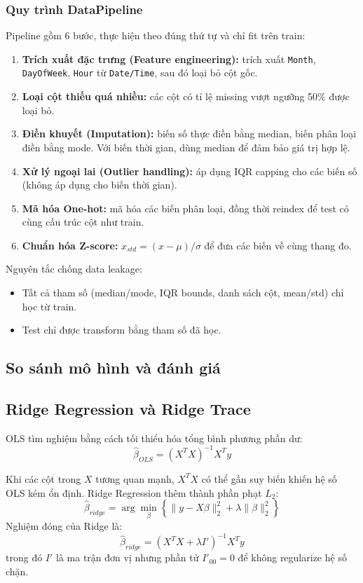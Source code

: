\documentclass[a4paper]{article}
\begin{document}
\subsubsection{Quy trình DataPipeline}
Pipeline gồm 6 bước, thực hiện theo đúng thứ tự và chỉ fit trên train:
\begin{enumerate}
    \item \textbf{Trích xuất đặc trưng (Feature engineering):} trích xuất \texttt{Month}, \texttt{DayOfWeek}, \texttt{Hour} từ \texttt{Date/Time}, sau đó loại bỏ cột gốc.
    \item \textbf{Loại cột thiếu quá nhiều:} các cột có tỉ lệ missing vượt ngưỡng 50\% được loại bỏ.
    \item \textbf{Điền khuyết (Imputation):} biến số thực điền bằng median, biến phân loại điền bằng mode. Với biến thời gian, dùng median để đảm bảo giá trị hợp lệ.
    \item \textbf{Xử lý ngoại lai (Outlier handling):} áp dụng IQR capping cho các biến số (không áp dụng cho biến thời gian).
    \item \textbf{Mã hóa One-hot:} mã hóa các biến phân loại, đồng thời reindex để test có cùng cấu trúc cột như train.
    \item \textbf{Chuẩn hóa Z-score:} $x_{std} = (x-\mu)/\sigma$ để đưa các biến về cùng thang đo.
\end{enumerate}

Nguyên tắc chống data leakage:
\begin{itemize}
    \item Tất cả tham số (median/mode, IQR bounds, danh sách cột, mean/std) chỉ học từ train.
    \item Test chỉ được transform bằng tham số đã học.
\end{itemize}

\subsection{So sánh mô hình và đánh giá}

\subsection{Ridge Regression và Ridge Trace}
OLS tìm nghiệm bằng cách tối thiểu hóa tổng bình phương phần dư:
\begin{equation}
\hat{\beta}_{OLS} = (X^T X)^{-1}X^T y
\end{equation}

Khi các cột trong $X$ tương quan mạnh, $X^T X$ có thể gần suy biến khiến hệ số OLS kém ổn định. Ridge Regression thêm thành phần phạt $L_2$:
\begin{equation}
\hat{\beta}_{ridge} = \arg\min_{\beta}\left\{\lVert y - X\beta \rVert_2^2 + \lambda \lVert \beta \rVert_2^2\right\}
\end{equation}
Nghiệm đóng của Ridge là:
\begin{equation}
\hat{\beta}_{ridge} = (X^T X + \lambda I')^{-1} X^T y
\end{equation}
trong đó $I'$ là ma trận đơn vị nhưng phần tử $I'_{00}=0$ để không regularize hệ số chặn.
\end{document}
